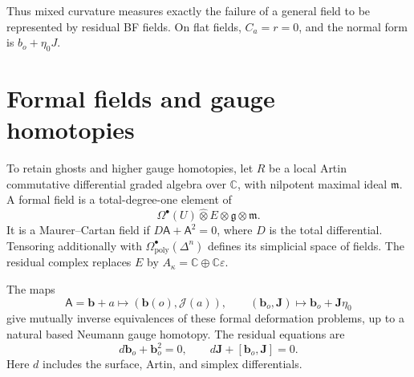 Thus mixed curvature measures exactly the failure of a general field
to be represented by residual BF fields. On flat fields, $C_a=r=0$,
and the normal form is $b_o+\eta_0J$.

\section{Formal fields and gauge homotopies}

To retain ghosts and higher gauge homotopies, let $R$ be a local Artin
commutative differential graded algebra over $\mathbb C$, with nilpotent
maximal ideal $\mathfrak m$. A formal field is a total-degree-one element
of
\[
 \Omega^\bullet(U)\widehat\otimes E\otimes\mathfrak g
                                      \otimes\mathfrak m.
\]
It is a Maurer--Cartan field if $D\mathsf A+\mathsf A^2=0$, where $D$
is the total differential. Tensoring additionally with
$\Omega^\bullet_{\mathrm{poly}}(\Delta^n)$ defines its simplicial space
of fields. The residual complex replaces $E$ by
$A_\kappa=\mathbb C\oplus\mathbb C\varepsilon$.

\begin{theorem}\label{mht:thm:formal-bf-reduction}
The maps
\[
 \mathsf A=\mathbf b+a\longmapsto(\mathbf b(o),\mathcal J(a)),
 \qquad
 (\mathbf b_o,\mathbf J)\longmapsto\mathbf b_o+\mathbf J\eta_0
\]
give mutually inverse equivalences of these formal deformation
problems, up to a natural based Neumann gauge homotopy.
The residual equations are
\begin{equation}\label{mht:eq:residual-mc}
 d\mathbf b_o+\mathbf b_o^2=0,\qquad
 d\mathbf J+[\mathbf b_o,\mathbf J]=0.
\end{equation}
Here $d$ includes the surface, Artin, and simplex differentials.
\end{theorem}

